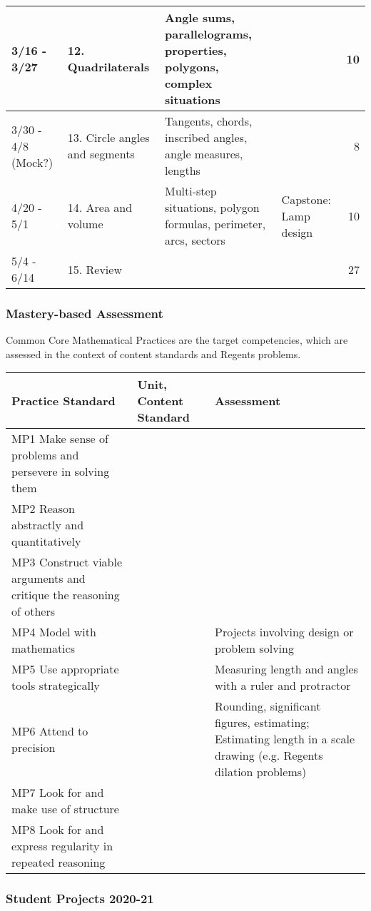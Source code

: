 \documentclass[12pt, twoside]{article}
\begin{document}
\begin{tabular}{|p{2.4cm}|p{4.7cm}|p{9cm}|p{4cm}|r|}
  \hline
  3/16 - 3/27 & 12. Quadrilaterals & Angle sums, parallelograms, properties, polygons, complex situations & & 10 \\
  \hline
  3/30 - 4/8 (Mock?) & 13. Circle angles and segments & Tangents, chords, inscribed angles, angle measures, lengths &  & 8 \\
  \hline
  4/20 - 5/1 & 14. Area and volume & Multi-step situations,  polygon formulas, perimeter, arcs, sectors &Capstone: Lamp design & 10 \\
  \hline
  5/4 - 6/14 & 15. Review &  & & 27 \\
  \hline
\end{tabular}

\newpage
\subsubsection*{Mastery-based Assessment}

Common Core Mathematical Practices are the target competencies, which are assessed in the context of content standards and Regents problems. \\[0.25in]
\begin{tabular}{|p{6.5cm}|p{5cm}|p{9cm}|}
  \hline
  Practice Standard & Unit, Content Standard & Assessment \\
  \hline
  MP1 Make sense of problems and persevere in solving them & & \\
  \hline
  MP2 Reason abstractly and quantitatively & & \\
  \hline
  MP3 Construct viable arguments and critique the reasoning of others & & \\
  \hline
  MP4 Model with mathematics & & Projects involving design or problem solving \\
  \hline
  MP5 Use appropriate tools strategically & & Measuring length and angles with a ruler and protractor \\
  \hline
  MP6 Attend to precision & & Rounding, significant figures, estimating; Estimating length in a scale drawing (e.g. Regents dilation problems) \\
  \hline
  MP7 Look for and make use of structure & & \\
  \hline
  MP8 Look for and express regularity in repeated reasoning & & \\
  \hline
\end{tabular}



\newpage
\subsubsection*{Student Projects 2020-21}
\end{document}

